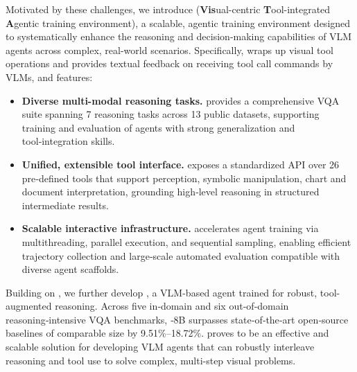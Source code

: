 Motivated by these challenges, we introduce \env{} (\textbf{Vis}ual-centric \textbf{T}ool-integrated \textbf{A}gentic training environment), a scalable, agentic training environment designed to systematically enhance the reasoning and decision-making capabilities of VLM agents across complex, real-world scenarios. Specifically, \env{} wraps up visual tool operations and provides textual feedback on receiving tool call commands by VLMs, and features:
\begin{itemize}[leftmargin=*,noitemsep,topsep=2pt]
    \item \textbf{Diverse multi-modal reasoning tasks.} \env{} provides a comprehensive VQA suite spanning 7 reasoning tasks across 13 public datasets, supporting training and evaluation of agents with strong generalization and tool‑integration skills.  
    \item \textbf{Unified, extensible tool interface.} \env{} exposes a standardized API over 26 pre‑defined tools that support perception, symbolic manipulation, chart and document interpretation, grounding high‑level reasoning in structured intermediate results. 
    \item \textbf{Scalable interactive infrastructure.} \env{} accelerates agent training via multithreading, parallel execution, and sequential sampling, enabling efficient trajectory collection and large‑scale automated evaluation compatible with diverse agent scaffolds.  
\end{itemize}
Building on \env{}, we further develop \ours{}, a VLM-based agent trained for robust, tool-augmented reasoning. Across five in‑domain and six out‑of‑domain reasoning‑intensive VQA benchmarks, \ours{}‑8B surpasses state‑of‑the‑art open‑source baselines of comparable size by 9.51\%–18.72\%. \env{} proves to be an effective and scalable solution for developing VLM agents that can robustly interleave reasoning and tool use to solve complex, multi-step visual problems.
